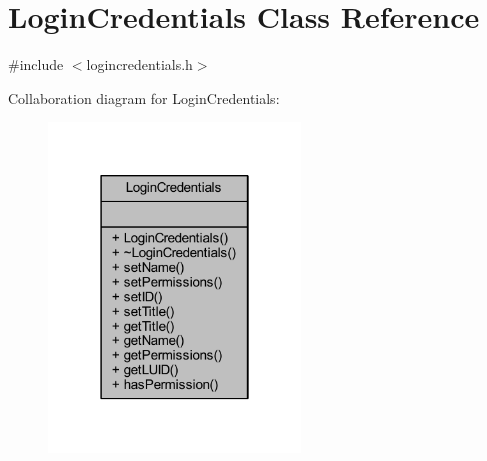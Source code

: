 \hypertarget{class_login_credentials}{}\section{Login\+Credentials Class Reference}
\label{class_login_credentials}


{\ttfamily \#include $<$logincredentials.\+h$>$}



Collaboration diagram for Login\+Credentials\+:
\nopagebreak
\begin{figure}[H]
\begin{center}
\leavevmode
\includegraphics[width=190pt]{class_login_credentials__coll__graph}
\end{center}
\end{figure}
